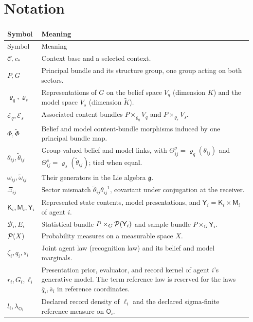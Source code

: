 \chapter{Notation}
\label{app:notation}
\begingroup
\small{}

\begin{longtable}{@{}p{}p{}@{}}
Symbol & Meaning \\
\endfirsthead
Symbol & Meaning \\
\endhead
$\mathcal C,c_*$ & Context base and a selected context. \\
$P,G$ & Principal bundle and its structure group, one group acting on both sectors. \\
$\varrho_q,\varrho_s$ & Representations of $G$ on the belief space $V_q$ (dimension $K$) and the model space $V_s$ (dimension $\tilde K$). \\
$\mathcal E_q,\mathcal E_s$ & Associated content bundles $P\times_{\varrho_q}V_q$ and $P\times_{\varrho_s}V_s$. \\
$\Phi,\tilde\Phi$ & Belief and model content-bundle morphisms induced by one principal bundle map. \\
$\theta_{ij},\tilde\theta_{ij}$ & Group-valued belief and model links, with $\Theta_{ij}^q=\varrho_q(\theta_{ij})$ and $\Theta_{ij}^s=\varrho_s(\tilde\theta_{ij})$; tied when equal. \\
$\omega_{ij},\tilde\omega_{ij}$ & Their generators in the Lie algebra $\mathfrak g$. \\
$\Xi_{ij}$ & Sector mismatch $\tilde\theta_{ij}\theta_{ij}^{-1}$, covariant under conjugation at the receiver. \\
$\mathsf K_i,\mathsf M_i,\mathsf Y_i$ & Represented state contents, model presentations, and $\mathsf Y_i=\mathsf K_i\times\mathsf M_i$ of agent $i$. \\
$\mathcal B_i,E_i$ & Statistical bundle $P\times_G\mathcal P(\mathsf Y_i)$ and sample bundle $P\times_G\mathsf Y_i$. \\
$\mathcal P(X)$ & Probability measures on a measurable space $X$. \\
$\zeta_i,q_i,s_i$ & Joint agent law (recognition law) and its belief and model marginals. \\
$r_i,G_i,\ell_i$ & Presentation prior, evaluator, and record kernel of agent $i$'s generative model. The term reference law is reserved for the laws $\bar q_i,\bar s_i$ in reference coordinates. \\
$l_i,\lambda_{\mathsf O_i}$ & Declared record density of $\ell_i$ and the declared sigma-finite reference measure on $\mathsf O_i$. \\

\end{longtable}
